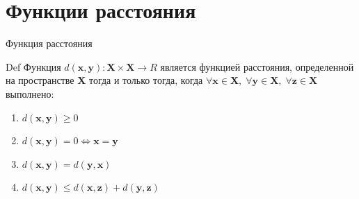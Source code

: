 \documentclass[10pt,a4paper]{beamer}
\begin{document}

\section{Функции расстояния}


\begin{frame}{Функция расстояния}

\begin{exampleblock}{Def}
Функция $d(\mathbf{x}, \mathbf{y}): \mathbf{X} \times \mathbf{X} \rightarrow R$ является функцией расстояния, определенной на пространстве $\mathbf{X}$ тогда и только тогда, когда $\forall \mathbf{x} \in \mathbf{X}, \; \forall \mathbf{y} \in \mathbf{X}, \; \forall \mathbf{z} \in \mathbf{X}$ выполнено:
\begin{enumerate}
\item $d(\mathbf{x}, \mathbf{y}) \geq 0$
\item $d(\mathbf{x}, \mathbf{y}) = 0 \Leftrightarrow \mathbf{x} = \mathbf{y}$
\item $d(\mathbf{x}, \mathbf{y}) = d(\mathbf{y}, \mathbf{x})$
\item $d(\mathbf{x}, \mathbf{y}) \leq d(\mathbf{x}, \mathbf{z}) + d(\mathbf{y}, \mathbf{z})$
\end{enumerate}
\end{exampleblock}

\end{frame}

\end{document}
